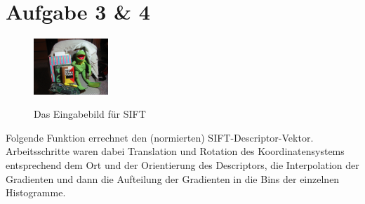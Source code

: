 




\newcommand{\nr}{1}


\section*{Aufgabe 3 \& 4}

\begin{figure}[htpb]
\begin{center}
{\includegraphics[width=0.25\textwidth]{samples/kermit001}}
\end{center}
\caption{Das Eingabebild für SIFT }
\label{fig:u02-picture}
\end{figure}

Folgende Funktion errechnet den (normierten) SIFT-Descriptor-Vektor.
Arbeitsschritte waren dabei Translation und Rotation des Koordinatensystems entsprechend dem Ort und der Orientierung des Descriptors, die Interpolation der Gradienten und dann die Aufteilung der Gradienten in die Bins der einzelnen Histogramme.

